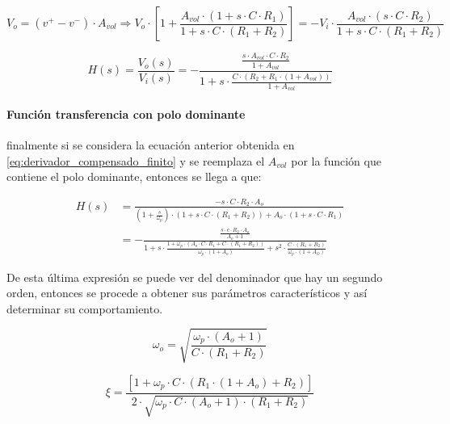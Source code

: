 \begin{equation*}
	V_o = (v^{+} - v^{-}) \cdot A_{vol} \Rightarrow
	V_o \cdot \left[ 1 + \frac{A_{vol} \cdot (1 + s \cdot C \cdot R_1)}{1 + s \cdot C \cdot (R_1 + R_2)} \right] =
	- V_i \cdot \frac{A_{vol} \cdot (s \cdot C \cdot R_2)}{1 + s \cdot C \cdot (R_1 + R_2)}
\end{equation*}

\begin{equation}
	H(s) = \frac{V_o(s)}{V_i(s)} = - \frac{\frac{s \cdot A_{vol} \cdot C \cdot R_2}{1 + A_{vol}}}{1 + s \cdot \frac{C \cdot (R_2 + R_1 \cdot(1 + A_{vol}))}{1 + A_{vol}}}
	\label{eq:derivador_compensado_finito}
\end{equation}

\paragraph*{Funci\'on transferencia con polo dominante} finalmente si se considera la ecuaci\'on anterior obtenida en \ref{eq:derivador_compensado_finito} y se reemplaza el $A_{vol}$ por la funci\'on que contiene el polo dominante, entonces se llega a que:

\begin{align*}
	H(s) & = \frac{-s \cdot C \cdot R_2 \cdot A_o}{\left( 1 + \frac{s}{\omega_p} \right) \cdot \left( 1 + s \cdot C \cdot (R_1 + 	R_2) \right) + A_o \cdot(1+ s \cdot C \cdot R_1)} \\
	& = - \frac{ \frac{s \cdot c \cdot R_2 \cdot A_o}{A_o + 1} }{1 + s \cdot \frac{1+ \omega_p \cdot \left( A_o \cdot C \cdot R_1 + C \cdot ( R_1 + R_2) \right)}{\omega_p \cdot ( 1 + A_o)} + s^{2} \cdot \frac{C \cdot (R_1 + R_2)}{\omega_p \cdot (1+ A_O)}}
\end{align*}

De esta \'ultima expresi\'on se puede ver del denominador que hay un segundo orden, entonces se procede a obtener sus par\'ametros caracter\'isticos y as\'i determinar su comportamiento.

\begin{equation}
	\omega_o = \sqrt{\frac{\omega_p \cdot ( A_o + 1 ) }{C \cdot ( R_1 + R_2 ) }}
\end{equation}

\begin{equation}
	\xi = \frac{\left[ 1 + \omega_p \cdot C \cdot ( R_1 \cdot (1 + A_o) + R_2) \right] }{2 \cdot \sqrt{\omega_p \cdot C \cdot (A_o + 1) \cdot (R_1 + R_2)}}
	\label{eq:formula_xi}
\end{equation}

